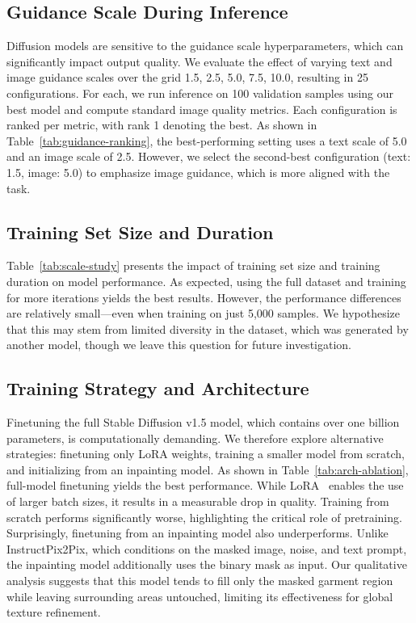 \documentclass[11pt,twocolumn]{article}
\begin{document}
\subsection{Guidance Scale During Inference}
\vspace{-.8em}

Diffusion models are sensitive to the guidance scale hyperparameters, which can significantly impact output quality. 
We evaluate the effect of varying text and image guidance scales over the grid {1.5, 2.5, 5.0, 7.5, 10.0}, resulting 
in 25 configurations. For each, we run inference on 100 validation samples using our best model and compute 
standard image quality metrics. Each configuration is ranked per metric, with rank 1 denoting the best. 
As shown in Table~\ref{tab:guidance-ranking}, the best-performing setting uses a text scale of 5.0 and an image scale of 2.5. 
However, we select the second-best configuration (text: 1.5, image: 5.0) to emphasize image guidance, which is more aligned 
with the task.

\subsection{Training Set Size and Duration}

Table~\ref{tab:scale-study} presents the impact of training set size and training duration on model performance. 
As expected, using the full dataset and training for more iterations yields the best results. 
However, the performance differences are relatively small—even when training on just 5,000 samples. 
We hypothesize that this may stem from limited diversity in the dataset, which was generated by another model, 
though we leave this question for future investigation.


\subsection{Training Strategy and Architecture}

Finetuning the full Stable Diffusion v1.5 model, which contains over one billion parameters, 
is computationally demanding. We therefore explore alternative strategies: finetuning only LoRA weights, training a smaller model 
from scratch, and initializing from an inpainting model. As shown in Table~\ref{tab:arch-ablation}, full-model finetuning yields 
the best performance. While LoRA~\cite{lora} enables the use of larger batch sizes, 
it results in a measurable drop in quality. Training from scratch performs significantly worse, 
highlighting the critical role of pretraining. Surprisingly, finetuning from an inpainting model also underperforms. 
Unlike InstructPix2Pix, which conditions on the masked image, noise, and text prompt, the inpainting model additionally uses the binary mask as 
input. Our qualitative analysis suggests that this model tends to fill only the masked garment region while leaving 
surrounding areas untouched, limiting its effectiveness for global texture refinement.
\end{document}
